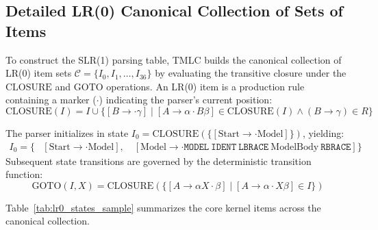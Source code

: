 \documentclass[11pt,a4paper]{article}
\begin{document}
\subsection{Detailed LR(0) Canonical Collection of Sets of Items}
\label{sec:lr0_canonical_items}
To construct the SLR(1) parsing table, TMLC builds the canonical collection of LR(0) item sets $\mathcal{C} = \{I_0, I_1, \dots, I_{36}\}$ by evaluating the transitive closure under the $\text{CLOSURE}$ and $\text{GOTO}$ operations. An LR(0) item is a production rule containing a marker ($\cdot$) indicating the parser's current position:
\begin{equation}
    \text{CLOSURE}(I) = I \cup \{ [B \rightarrow \cdot \gamma] \mid [A \rightarrow \alpha \cdot B \beta] \in \text{CLOSURE}(I) \land (B \rightarrow \gamma) \in R \}
\end{equation}

The parser initializes in state $I_0 = \text{CLOSURE}(\{[\text{Start} \rightarrow \cdot \text{Model}]\})$, yielding:
\begin{align*}
    I_0 = \{ &[\text{Start} \rightarrow \cdot \text{Model}], \quad [\text{Model} \rightarrow \cdot \texttt{MODEL} \ \texttt{IDENT} \ \texttt{LBRACE} \ \text{ModelBody} \ \texttt{RBRACE}] \}
\end{align*}
Subsequent state transitions are governed by the deterministic transition function:
\begin{equation}
    \text{GOTO}(I, X) = \text{CLOSURE}(\{ [A \rightarrow \alpha X \cdot \beta] \mid [A \rightarrow \alpha \cdot X \beta] \in I \})
\end{equation}

Table~\ref{tab:lr0_states_sample} summarizes the core kernel items across the canonical collection.
\end{document}
